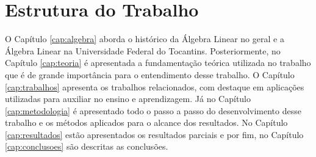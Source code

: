 \section{Estrutura do Trabalho}

\noindent O Capítulo \ref{cap:algebra} aborda o histórico da Álgebra Linear no geral e a Álgebra Linear na Universidade Federal do Tocantins. Posteriormente, no Capítulo \ref{cap:teoria} é apresentada a fundamentação teórica utilizada no trabalho que é de grande importância para o entendimento desse trabalho. O Capítulo \ref{cap:trabalhos} apresenta os trabalhos relacionados, com destaque em aplicações utilizadas para auxiliar no ensino e aprendizagem. Já no Capítulo \ref{cap:metodologia} é apresentado todo o passo a passo do desenvolvimento desse trabalho e os métodos aplicados para o alcance dos resultados. No Capítulo \ref{cap:resultados} estão apresentados os resultados parciais e por fim, no Capítulo \ref{cap:conclusoes} são descritas as conclusões.
